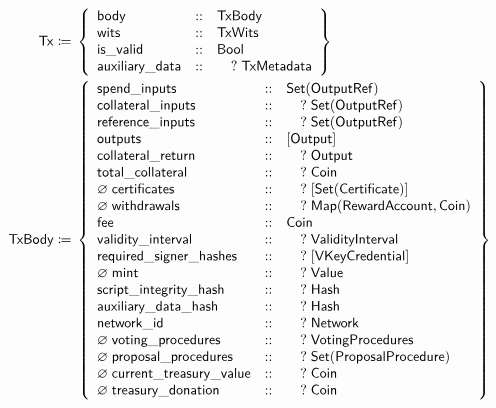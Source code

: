 \documentclass[../hydrozoa.tex]{subfiles}
\begin{document}
\begin{align*}
    \T{Tx} \coloneq\;& \left\{
    \begin{array}{lll}
      \T{body} &::& \T{TxBody} \\
        \T{wits} &::& \T{TxWits} \\
        \T{is\_valid} &::& \T{Bool} \\
        \T{auxiliary\_data} &::& \quad?\;\T{TxMetadata}
    \end{array} \right\} \\
    \T{TxBody} \coloneq\;& \left\{
    \begin{array}{lll}
      \T{spend\_inputs} &::& \T{Set(OutputRef)} \\
        \T{collateral\_inputs} &::& \quad?\;\T{Set(OutputRef)} \\
        \T{reference\_inputs} &::& \quad?\;\T{Set(OutputRef)} \\
        \T{outputs} &::& \T{[Output]} \\
        \T{collateral\_return} &::& \quad?\;\T{Output} \\
        \T{total\_collateral} &::& \quad?\;\T{Coin} \\
        \varnothing\;\T{certificates} &::& \quad?\;\T{[ Set(Certificate) ]} \\
        \varnothing\;\T{withdrawals} &::& \quad?\;\T{Map(RewardAccount, Coin)} \\
        \T{fee} &::& \T{Coin} \\
        \T{validity\_interval} &::& \quad?\;\T{ValidityInterval} \\
        \T{required\_signer\_hashes} &::& \quad?\;\T{[VKeyCredential]} \\
        \varnothing\;\T{mint} &::& \quad?\;\T{Value} \\
        \T{script\_integrity\_hash} &::& \quad?\;\T{Hash} \\
        \T{auxiliary\_data\_hash} &::& \quad?\;\T{Hash} \\
        \T{network\_id} &::& \quad?\;\T{Network} \\
        \varnothing\;\T{voting\_procedures} &::& \quad?\;\T{VotingProcedures} \\
        \varnothing\;\T{proposal\_procedures} &::& \quad?\;\T{Set(ProposalProcedure)} \\
        \varnothing\;\T{current\_treasury\_value} &::& \quad?\;\T{Coin} \\
        \varnothing\;\T{treasury\_donation} &::& \quad?\;\T{Coin}
    \end{array} \right\}\\

\end{align*}
\end{document}
